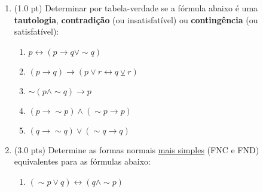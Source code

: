 \documentclass[12pt]{article}
\begin{document}
\begin{enumerate}

\begin{comment}
\item (1.0 pt) Determina o valor lógico das fórmulas abaixo:

\begin{itemize}
\setlength{\itemsep}{-3pt}
\item $-2 < 0 \leftrightarrow \pi^2 < 0 \wedge $ Roma é a capital da Itália
\item $3+4=7 \vee 13 $ é um número primo $\rightarrow \sqrt 16 > 2$
\item $3^2 + 4^2 = 5^2  ~\wedge $ Tóquio não fica no Japão $\rightarrow ( \pi > 2.04 \leftrightarrow 2 \neq 3 )$
\item Na Espanha se fala português $\wedge~ 2^3 - 4 > 5^2 - 10 \vee 5 \neq 3+3$
\end{itemize}
\end{comment}

\item (1.0 pt) Determinar por tabela-verdade se a fórmula abaixo é uma {\bf tautologia}, {\bf contradição} (ou insatisfatível) ou {\bf contingência} (ou satisfatível): 

\begin{enumerate}
\setlength{\itemsep}{-2pt}


\item $p \leftrightarrow (p \rightarrow q \vee \sim q)$


\item $(p \rightarrow q) \rightarrow (p \vee r \leftrightarrow q \veebar r)$


\item $\sim (p \wedge \sim q) \rightarrow  p$ 


\item $ (p \rightarrow \sim p) \wedge (\sim p \rightarrow  p) $ 

\item $ (q \rightarrow \sim q) \vee (\sim q \rightarrow  q) $
\end{enumerate}


\item (3.0 pts) Determine as formas normais \underline{mais simples} (FNC e FND) equivalentes para as fórmulas abaixo: 
\begin{enumerate}
\setlength{\itemsep}{-2pt}

\item $(\sim p \vee q)  \leftrightarrow  (q \wedge \sim p) $


\end{enumerate}
\end{enumerate}
\end{document}
